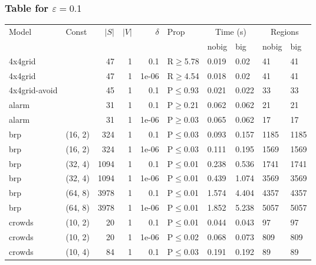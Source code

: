 \subsubsection{Table for \(\varepsilon=0.1\)}
\begin{longtable}{llrrrlllll}

        \toprule
        Model & Const & $|S|$ & $|V|$ & $\delta$ & Prop & \multicolumn{2}{c}{Time (s)} & \multicolumn{2}{c}{Regions} \\
        \cmidrule(ll){7-8} \cmidrule(ll){9-10}
        & & & & & & nobig & big & nobig & big \\
        \midrule
        
 4x4grid       &           &     	47 & 1 & 0.1   & R$\geq$5.78  & 0.019  & 0.02    & 41      & 41      \\
 4x4grid       &           &     	47 & 1 & 1e-06 & R$\geq$4.54  & 0.018  & 0.02    & 41      & 41      \\
 4x4grid-avoid &           &     	45 & 1 & 0.1   & P$\leq$0.93  & 0.021  & 0.022   & 33      & 33      \\
 alarm         &           &     	31 & 1 & 0.1   & P$\geq$0.21  & 0.062  & 0.062   & 21      & 21      \\
 alarm         &           &     	31 & 1 & 1e-06 & P$\geq$0.03  & 0.065  & 0.062   & 17      & 17      \\
 brp           & (16, 2)   &    	324 & 1 & 0.1   & P$\leq$0.03  & 0.093  & 0.157   & 1185    & 1185    \\
 brp           & (16, 2)   &    	324 & 1 & 1e-06 & P$\leq$0.03  & 0.111  & 0.195   & 1569    & 1569    \\
 brp           & (32, 4)   &   	1094 & 1 & 0.1   & P$\leq$0.01  & 0.238  & 0.536   & 1741    & 1741    \\
 brp           & (32, 4)   &   	1094 & 1 & 1e-06 & P$\leq$0.01  & 0.439  & 1.074   & 3569    & 3569    \\
 brp           & (64, 8)   &   	3978 & 1 & 0.1   & P$\leq$0.01  & 1.574  & 4.404   & 4357    & 4357    \\
 brp           & (64, 8)   &   	3978 & 1 & 1e-06 & P$\leq$0.01  & 1.852  & 5.238   & 5057    & 5057    \\
 crowds        & (10, 2)   &     	20 & 1 & 0.1   & P$\leq$0.01  & 0.044  & 0.043   & 97      & 97      \\
 crowds        & (10, 2)   &     	20 & 1 & 1e-06 & P$\leq$0.02  & 0.068  & 0.073   & 809     & 809     \\
 crowds        & (10, 4)   &     	84 & 1 & 0.1   & P$\leq$0.03  & 0.191  & 0.192   & 89      & 89      \\

\end{longtable}
